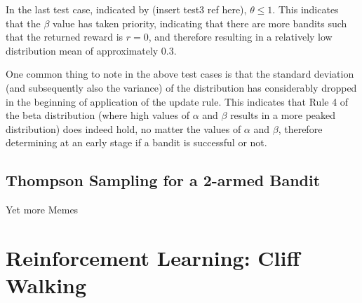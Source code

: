\documentclass{article}
\begin{document}
In the last test case, indicated by (insert test3 ref here), $\theta \leq 1$. This indicates that the $\beta$ value has taken priority, indicating that there are more bandits such that the returned reward is $r=0$, and therefore resulting in a relatively low distribution mean of approximately $0.3$.

One common thing to note in the above test cases is that the standard deviation (and subsequently also the variance) of the distribution has considerably dropped in the beginning of application of the update rule. This indicates that Rule 4 of the beta distribution (where high values of $\alpha$ and $\beta$ results in a more peaked distribution) does indeed hold, no matter the values of $\alpha$ and $\beta$, therefore determining at an early stage if a bandit is successful or not.


\subsection{Thompson Sampling for a 2-armed Bandit}
Yet more Memes
\section{Reinforcement Learning: Cliff Walking}
\end{document}
